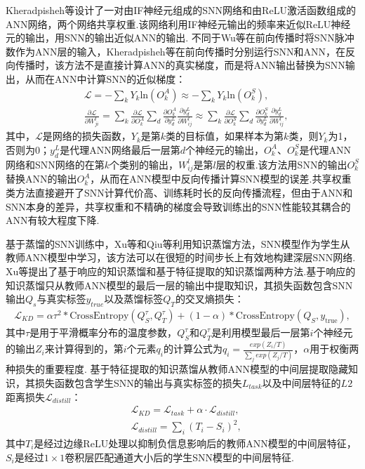 \documentclass{SCIS2020cn}
\begin{document}
Kheradpisheh等\cite{kheradpisheh2022spiking}设计了一对由IF神经元组成的SNN网络和由ReLU激活函数组成的ANN网络，两个网络共享权重.该网络利用IF神经元输出的频率来近似ReLU神经元的输出，用SNN的输出近似ANN的输出.
不同于Wu等\cite{wu2021tandem}在前向传播时将SNN脉冲数作为ANN层的输入，Kheradpisheh等\cite{kheradpisheh2022spiking}在前向传播时分别运行SNN和ANN，在反向传播时，该方法不是直接计算ANN的真实梯度，而是将ANN输出替换为SNN输出，从而在ANN中计算SNN的近似梯度：
\begin{align}
    &\mathcal{L}=-\sum_k{Y_{k}\mathrm{ln}(O_k^A)}\approx-\sum_k{Y_{k}\mathrm{ln}(O_k^S)},\\
    &\frac{\partial \mathcal{L}}{\partial W^l_{ji}}=\sum_k{\frac{\partial \mathcal{L}}{\partial O^A_{k}}\sum_d{\frac{\partial O^A_k}{\partial y^L_d}\frac{\partial y^L_d}{\partial W^l_{ij}}}}\approx \sum_k{\frac{\partial \mathcal{L}}{\partial O^S_{k}}\sum_d{\frac{\partial O^S_k}{\partial y^L_d}\frac{\partial y^L_d}{\partial W^l_{ij}}}},
\end{align}
其中，$\mathcal{L}$是网络的损失函数，$Y_k$是第$k$类的目标值，如果样本为第$k$类，则$Y_k$为1，否则为0；$y^L_{d}$是代理ANN网络最后一层第$d$个神经元的输出，$O^A_k$、$O^S_k$是代理ANN网络和SNN网络的在第$k$个类别的输出，$W^l_{ij}$是第$l$层的权重.该方法用SNN的输出$O^S_k$替换ANN的输出$O^A_k$，从而在ANN模型中反向传播计算SNN模型的误差.共享权重类方法直接避开了SNN计算代价高、训练耗时长的反向传播流程，但由于ANN和SNN本身的差异，共享权重和不精确的梯度会导致训练出的SNN性能较其耦合的ANN有较大程度下降.

基于蒸馏的SNN训练中，Xu等\cite{xu2023constructing}和Qiu等\cite{qiu2024self}利用知识蒸馏方法，SNN模型作为学生从教师ANN模型中学习，该方法可以在很短的时间步长上有效地构建深层SNN网络. Xu等\cite{xu2023constructing}提出了基于响应的知识蒸馏和基于特征提取的知识蒸馏两种方法.基于响应的知识蒸馏只从教师ANN模型的最后一层的输出中提取知识，其损失函数包含SNN输出$Q_s$与真实标签$y_{true}$以及蒸馏标签$Q_T$的交叉熵损失：
\begin{eqnarray}
    \mathcal{L}_{KD} = \alpha \tau^2 * \text{CrossEntropy}(Q_S^{\tau}, Q_T^{\tau})+(1-\alpha) * \text{CrossEntropy}(Q_S, y_{\text{true}}),
\end{eqnarray}
其中$\tau$是用于平滑概率分布的温度参数，$Q_S^{\tau}$和$Q_T^{\tau}$是利用模型最后一层第$i$个神经元的输出$Z_i$来计算得到的，第$i$个元素$q_i$的计算公式为$q_i=\frac{exp(Z_i/T)}{\sum_{j}{exp(Z_j/T)}}$，$\alpha$用于权衡两种损失的重要程度.
基于特征提取的知识蒸馏从教师ANN模型的中间层提取隐藏知识，其损失函数包含学生SNN的输出与真实标签的损失$L_{task}$以及中间层特征的$L2$距离损失$\mathcal{L}_{distill}$：
\begin{align}
    &\mathcal{L}_{KD}=\mathcal{L}_{task}+\alpha \cdot \mathcal{L}_{distill},\\
    &\mathcal{L}_{distill}=\sum_{i}(T_i-S_i)^2,
\end{align}
其中$T_i$是经过边缘ReLU处理以抑制负信息影响后的教师ANN模型的中间层特征，$S_i$是经过$1\times1$卷积层匹配通道大小后的学生SNN模型的中间层特征. %
\end{document}
